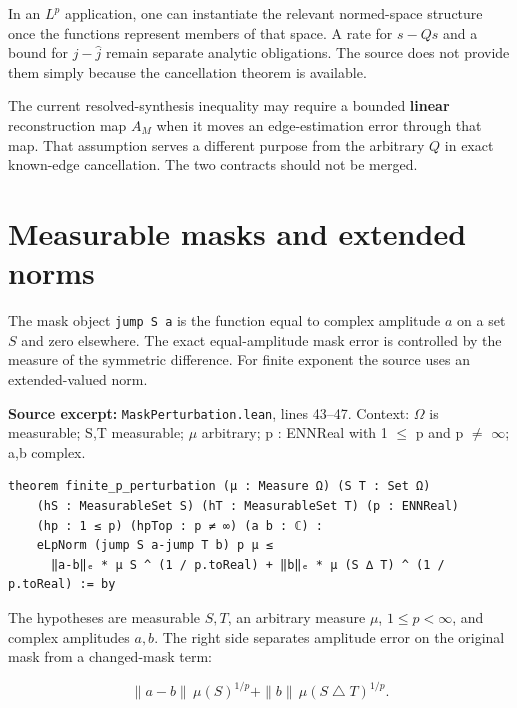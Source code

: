 \documentclass[11pt]{article}
\begin{document}
In an \(L^p\) application, one can instantiate the relevant normed-space structure once the functions represent members of that space. A rate for \(s-Qs\) and a bound for \(j-\widehat j\) remain separate analytic obligations. The source does not provide them simply because the cancellation theorem is available.

The current resolved-synthesis inequality may require a bounded \textbf{linear} reconstruction map \(A_M\) when it moves an edge-estimation error through that map. That assumption serves a different purpose from the arbitrary \(Q\) in exact known-edge cancellation. The two contracts should not be merged.

\hypertarget{measurable-masks-and-extended-norms}{%
\section{Measurable masks and extended norms}\label{measurable-masks-and-extended-norms}}

The mask object \texttt{jump S a} is the function equal to complex amplitude \(a\) on a set \(S\) and zero elsewhere. The exact equal-amplitude mask error is controlled by the measure of the symmetric difference. For finite exponent the source uses an extended-valued norm.

\textbf{Source excerpt:} \texttt{MaskPerturbation.lean}, lines 43--47. Context: \ensuremath{\Omega} is measurable; S,T measurable; \ensuremath{\mu} arbitrary; p : ENNReal with 1 \ensuremath{\le} p and p \ensuremath{\ne} \ensuremath{\infty}; a,b complex.

\begin{minipage}{\linewidth}
\begin{lstlisting}
theorem finite_p_perturbation (μ : Measure Ω) (S T : Set Ω)
    (hS : MeasurableSet S) (hT : MeasurableSet T) (p : ENNReal)
    (hp : 1 ≤ p) (hpTop : p ≠ ∞) (a b : ℂ) :
    eLpNorm (jump S a-jump T b) p μ ≤
      ‖a-b‖ₑ * μ S ^ (1 / p.toReal) + ‖b‖ₑ * μ (S ∆ T) ^ (1 / p.toReal) := by
\end{lstlisting}
\end{minipage}\par

The hypotheses are measurable \(S,T\), an arbitrary measure \(\mu\), \(1\le p<\infty\), and complex amplitudes \(a,b\). The right side separates amplitude error on the original mask from a changed-mask term:

\[\|a-b\|\,\mu(S)^{1/p}+\|b\|\,\mu(S\mathbin{\triangle}T)^{1/p}.\]
\end{document}
